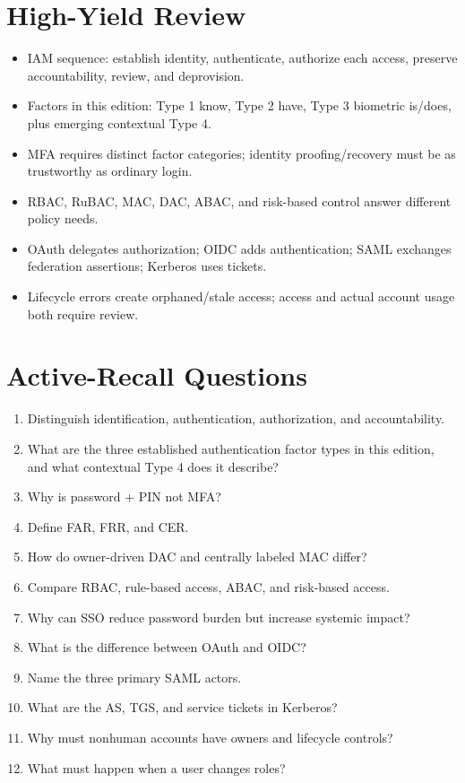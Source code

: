 \documentclass[10pt,letterpaper]{article}
\begin{document}
\section{\color{navy}High-Yield Review}
\begin{itemize}
\item IAM sequence: establish identity, authenticate, authorize each access, preserve accountability, review, and deprovision.
\item Factors in this edition: Type 1 know, Type 2 have, Type 3 biometric is/does, plus emerging contextual Type 4.
\item MFA requires distinct factor categories; identity proofing/recovery must be as trustworthy as ordinary login.
\item RBAC, RuBAC, MAC, DAC, ABAC, and risk-based control answer different policy needs.
\item OAuth delegates authorization; OIDC adds authentication; SAML exchanges federation assertions; Kerberos uses tickets.
\item Lifecycle errors create orphaned/stale access; access and actual account usage both require review.
\end{itemize}

\section{\color{navy}Active-Recall Questions}
\begin{enumerate}
\item Distinguish identification, authentication, authorization, and accountability.
\item What are the three established authentication factor types in this edition, and what contextual Type 4 does it describe?
\item Why is password + PIN not MFA?
\item Define FAR, FRR, and CER.
\item How do owner-driven DAC and centrally labeled MAC differ?
\item Compare RBAC, rule-based access, ABAC, and risk-based access.
\item Why can SSO reduce password burden but increase systemic impact?
\item What is the difference between OAuth and OIDC?
\item Name the three primary SAML actors.
\item What are the AS, TGS, and service tickets in Kerberos?
\item Why must nonhuman accounts have owners and lifecycle controls?
\item What must happen when a user changes roles?
\end{enumerate}
\end{document}
